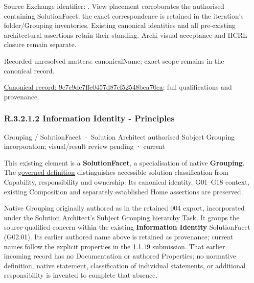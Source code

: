 Source Exchange identifier: \texttt{}. View placement corroborates
the authorised containing SolutionFacet; the exact correspondence is retained in the
iteration's folder/Grouping inventories. Existing canonical identities and all
pre-existing architectural assertions retain their standing. Archi visual
acceptance and HCRL closure remain separate.


{\small Recorded unresolved matters: canonicalName; exact scope remains in the canonical record.}\par
{\footnotesize \href{../../../../../../../continuum/grouping/9c7c9de7ffc0457d87cf52548bca70ca.md}{Canonical record: 9c7c9de7ffc0457d87cf52548bca70ca}; full qualifications and provenance.}\par
\subsubsection*{R.3.2.1.2 Information Identity - Principles}
\label{navigation:R.3.2.1.2}

\label{element:d931781bb22243fdb892937b88141cf4}
{\small Grouping / SolutionFacet · Solution Architect authorised Subject Grouping incorporation; visual/result review pending · current}\par

This existing element is a \textbf{SolutionFacet}, a specialisation of native
\textbf{Grouping}. The \href{\detokenize{../../../../../../../governance/continuum-representation.md#solutionfacet-classification--1119-candidate}}{governed definition}
distinguishes accessible solution classification from Capability, responsibility
and ownership. Its canonical identity, G01–G18 context, existing Composition
and separately established Home assertions are preserved.



Native Grouping originally authored as \texttt{} in the retained 004 export,
incorporated under the Solution Architect's Subject Grouping hierarchy Task.
It groups the source-qualified \texttt{} concern within
the existing \textbf{Information Identity} SolutionFacet (G02.01). Its earlier authored name above is retained as provenance; current names
follow the explicit properties in the 1.1.19 submission.
That earlier incoming record has no Documentation or authored Properties; no normative
definition, native statement, classification of individual statements, or
additional responsibility is invented to complete that absence.



